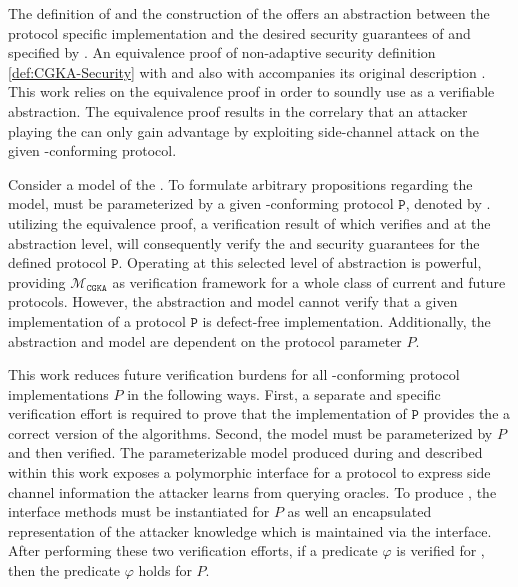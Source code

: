 The definition of  and the construction of the \CGKAsec offers an abstraction between the protocol specific implementation and the desired security guarantees of  and  specified by .
An equivalence proof of non-adaptive  security definition \ref{def:CGKA-Security} with  and also with  accompanies its original description \autocite{alwen2020security}.
This work relies on the equivalence proof in order to soundly use  as a verifiable abstraction.
The equivalence proof results in the correlary that an attacker playing the \CGKAsec can only gain advantage by exploiting side-channel attack on the given -conforming protocol.

Consider a model \CGKAmod{}{}{} of the \CGKAsec.
To formulate arbitrary propositions regarding the model, \CGKAmod{}{}{} must be parameterized by a given -conforming protocol \(\mathtt{P}\), denoted by .
utilizing the equivalence proof, a verification result of  which verifies  and  at the abstraction level, will consequently verify the  and  security guarantees for the defined protocol \(\mathtt{P}\).
Operating at this selected level of abstraction is powerful, providing \(\mathcal{M}_{\texttt{CGKA}}\) as verification framework for a whole class of current and future protocols.
However, the  abstraction and model  cannot verify that a given implementation of a protocol \(\mathtt{P}\) is defect-free implementation.
Additionally, the  abstraction and model  are dependent on the protocol parameter \(P\).

This work reduces future verification burdens for all -conforming protocol implementations \(P\) in the following ways.
First, a separate and specific verification effort is required to prove that the implementation of \(\mathtt{P}\) provides the a correct version of the  algorithms.
Second, the model \CGKAmod{}{}{} must be parameterized by \(P\) and then verified.
The parameterizable model \CGKAmod{}{}{} produced during and described within this work exposes a polymorphic interface for a protocol to express side channel information the attacker learns from querying oracles.
To produce , the interface methods must be instantiated for \(P\) as well an encapsulated representation of the attacker knowledge which is maintained via the interface.
After performing these two verification efforts, if a predicate \(\varphi\) is verified for , then the predicate \(\varphi\) holds for \(P\).

